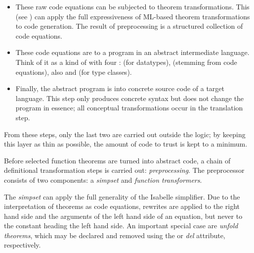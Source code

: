 \begin{isabellebody}
\begin{isamarkuptext}
\begin{itemize}
    \item These raw code equations can be subjected to theorem
      transformations.  This  (see
      ) can apply the full expressiveness of
      ML-based theorem transformations to code generation.  The result
      of preprocessing is a structured collection of code equations.

    \item These code equations are  to a program in an
      abstract intermediate language.  Think of it as a kind of
       with four :  (for
      datatypes),  (stemming from code equations), also
       and  (for type classes).

    \item Finally, the abstract program is  into
      concrete source code of a target language.  This step only
      produces concrete syntax but does not change the program in
      essence; all conceptual transformations occur in the translation
      step.

  \end{itemize}

  \noindent From these steps, only the last two are carried out
  outside the logic; by keeping this layer as thin as possible, the
  amount of code to trust is kept to a minimum.%
\end{isamarkuptext}%
\isamarkuptrue%
%
\isamarkuptrue%
%
\begin{isamarkuptext}%
Before selected function theorems are turned into abstract code, a
  chain of definitional transformation steps is carried out:
  \emph{preprocessing}.  The preprocessor consists of two
  components: a \emph{simpset} and \emph{function transformers}.

  The \emph{simpset} can apply the full generality of the Isabelle
  simplifier.  Due to the interpretation of theorems as code
  equations, rewrites are applied to the right hand side and the
  arguments of the left hand side of an equation, but never to the
  constant heading the left hand side.  An important special case are
  \emph{unfold theorems}, which may be declared and removed using the
  \hyperlink{attribute.code-unfold}{\mbox{}} or \emph{\hyperlink{attribute.code-unfold}{\mbox{}} del}
  attribute, respectively.


\end{isamarkuptext}
\end{isabellebody}
